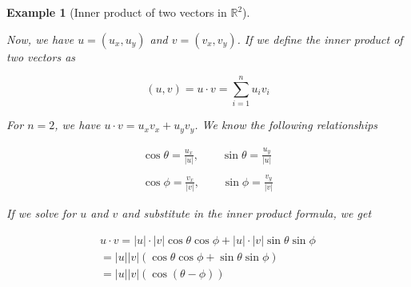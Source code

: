 \documentclass{book}
\newtheorem{example}{Example}[section]
\begin{document}
\begin{example}[Inner product of two vectors in $\mathbb{R}^{2}$]

    \begin{center}
    \end{center}

    Now, we have $u=\left(u_{x},u_{y}\right)$ and $v=\left(v_x, v_y\right)$. If we
    define the inner product of two vectors as

    \[
        \left(u,v\right) = u \cdot v = \sum_{i=1}^{n}{u_i v_i}
    \]

    For $n=2$, we have $u \cdot v = u_x v_x + u_y v_y$. We know the following
    relationships

    \begin{equation}
        \begin{split}
            \cos{\theta} = \frac{u_x}{|u|},\qquad
            \sin{\theta} = \frac{u_y}{|u|}
            \\\\
            \cos{\phi} = \frac{v_x}{|v|},\qquad
            \sin{\phi} = \frac{v_y}{|v|}
        \end{split}
    \end{equation}

    If we solve for $u$ and $v$ and substitute in the inner product formula, we get

    \begin{equation}
        \begin{split}
            u\cdot v = |u|\cdot|v|\cos\theta\cos\phi + |u|\cdot|v|\sin\theta\sin\phi
            \\ = |u||v|(\cos\theta\cos\phi + \sin\theta\sin\phi)
            \\ = |u||v|(\cos{\left(\theta - \phi\right)})
        \end{split}
    \end{equation}


\end{example}
\end{document}
